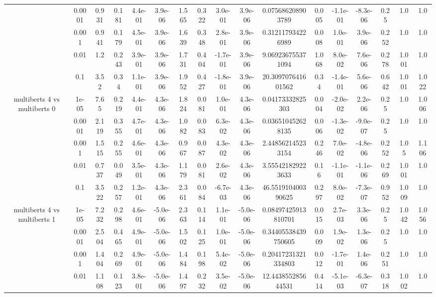 \begin{tabular}{|c|c|c|c|c|c|c|c|c|c|c|c|c|c|c|c|c|}
 & 0.0001 & 0.931 & 0.181 & 4.4e-01 & 3.9e-06 & 1.565 & 0.322 & 3.0e-01 & 3.9e-06 & 0.075686208903789 & 0.005 & -1.1e-01 & -8.3e-06 & 0.25 & 1.0 & 1.0 \\
 & 0.001 & 0.941 & 0.179 & 4.5e-01 & 3.9e-06 & 1.639 & 0.348 & 2.8e-01 & 3.9e-06 & 0.312117934226989 & 0.008 & 1.0e-01 & 3.9e-06 & 0.252 & 1.0 & 1.0 \\
 & 0.01 & 1.2 & 0.243 & 3.9e-01 & 3.9e-06 & 1.731 & 0.404 & -1.7e-01 & 3.9e-06 & 9.069236755371094 & 1.068 & 8.0e-02 & 7.6e-06 & 0.278 & 1.001 & 1.0 \\
 & 0.1 & 3.52 & 0.34 & 1.1e-01 & 3.9e-06 & 1.952 & 0.427 & -1.8e-01 & 3.9e-06 & 20.309707641601562 & 0.34 & -1.4e-01 & 5.6e-06 & 0.642 & 1.001 & 1.022 \\
\hline
\multirow{5}{*}{multiberts 4 vs multiberts 0} & 1e-05 & 7.65 & 0.219 & 4.4e-01 & 4.3e-06 & 1.824 & 0.081 & 1.0e-01 & 4.3e-06 & 0.04173332825303 & 0.004 & -2.0e-02 & 2.2e-06 & 0.25 & 1.0 & 1.006 \\
 & 0.0001 & 2.119 & 0.355 & 4.7e-01 & 4.3e-06 & 1.082 & 0.083 & 6.3e-02 & 4.3e-06 & 0.036510452628135 & 0.006 & -1.3e-02 & -9.0e-07 & 0.25 & 1.0 & 1.0 \\
 & 0.001 & 1.515 & 0.255 & 4.6e-01 & 4.3e-06 & 0.967 & 0.087 & 4.3e-02 & 4.3e-06 & 2.448562145233154 & 0.246 & 7.0e-02 & -4.8e-06 & 0.252 & 1.05 & 1.106 \\
 & 0.01 & 0.737 & 0.049 & 3.5e-01 & 4.3e-06 & 1.179 & 0.081 & 2.6e-02 & 4.3e-06 & 3.555421829223633 & 0.16 & -1.1e-01 & -1.1e-06 & 0.269 & 1.001 & 1.0 \\
 & 0.1 & 3.522 & 0.257 & 1.2e-01 & 4.3e-06 & 2.361 & 0.084 & -6.7e-03 & 4.3e-06 & 46.551910400390625 & 0.297 & 8.0e-02 & -7.3e-07 & 0.952 & 1.009 & 1.0 \\
\hline
\multirow{5}{*}{multiberts 4 vs multiberts 1} & 1e-05 & 7.232 & 0.298 & 4.6e-01 & -5.0e-06 & 2.363 & 0.114 & 1.1e-01 & -5.0e-06 & 0.08497425913810701 & 0.015 & 2.7e-03 & 3.3e-06 & 0.25 & 1.042 & 1.056 \\
 & 0.0001 & 2.504 & 0.465 & 4.9e-01 & -5.0e-06 & 1.502 & 0.125 & 1.0e-01 & -5.0e-06 & 0.34405538439750605 & 0.009 & 1.9e-02 & 1.3e-06 & 0.25 & 1.0 & 1.0 \\
 & 0.001 & 1.404 & 0.269 & 4.9e-01 & -5.0e-06 & 1.484 & 0.198 & 5.4e-02 & -5.0e-06 & 0.20417231321334803 & 0.012 & -1.7e-01 & 1.4e-06 & 0.251 & 1.0 & 1.0 \\
 & 0.01 & 1.108 & 0.123 & 3.8e-01 & -5.0e-06 & 1.497 & 0.232 & 3.5e-02 & -5.0e-06 & 12.443855285644531 & 0.414 & -5.1e-03 & -6.3e-07 & 0.318 & 1.002 & 1.0 \\

\end{tabular}
